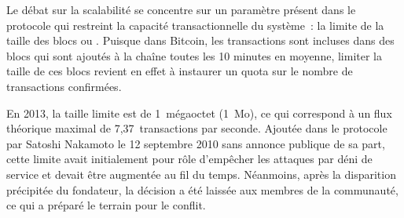 %

Le débat sur la scalabilité se concentre sur un paramètre présent dans le protocole qui restreint la capacité transactionnelle du système~: la limite de la taille des blocs ou . Puisque dans Bitcoin, les transactions sont incluses dans des blocs qui sont ajoutés à la chaîne toutes les 10 minutes en moyenne, limiter la taille de ces blocs revient en effet à instaurer un quota sur le nombre de transactions confirmées.

En 2013, la taille limite est de 1~mégaoctet (1~Mo), ce qui correspond à un flux théorique maximal de 7,37~transactions par seconde. Ajoutée dans le protocole par Satoshi Nakamoto le 12 septembre 2010 sans annonce publique de sa part, cette limite avait initialement pour rôle d'empêcher les attaques par déni de service et devait être augmentée au fil du temps. Néanmoins, après la disparition précipitée du fondateur, la décision a été laissée aux membres de la communauté, ce qui a préparé le terrain pour le conflit.

